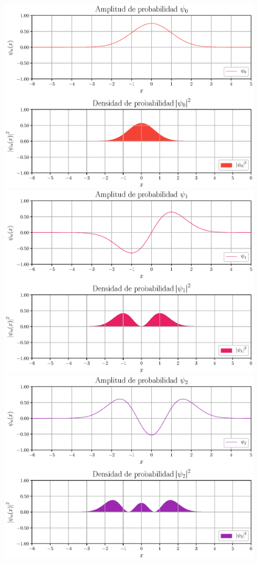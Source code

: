 \newpage
{}
\begin{figure}[hbt!]
    \centering
    \includegraphics[scale=0.6]{Imagenes/Funcion_Onda_00.eps}
    \includegraphics[scale=0.6]{Imagenes/Funcion_Onda_01.eps}
    \includegraphics[scale=0.6]{Imagenes/Funcion_Onda_02.eps}
\end{figure}

